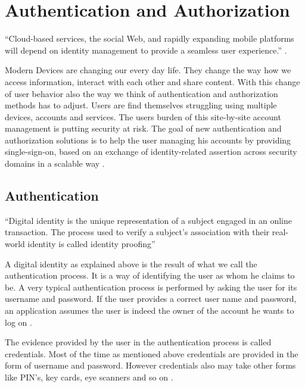 \chapter{Authentication and Authorization}\label{chap:authenticationandauthorization}

\chapterstart

“Cloud-based services, the social Web, and rapidly expanding mobile platforms will depend on identity management to provide a seamless user experience.”   \citet{Corre:2017:WHI}.

Modern Devices are changing our every day life. They change the way how we access information, interact with each other and share content. 
With this change of user behavior also the way we think of authentication and authorization methods has to adjust. Users are find themselves struggling using multiple devices, accounts and services. The users burden of this site-by-site account management is putting security at risk. The goal of new authentication and authorization solutions is to help the user managing his accounts by providing single-sign-on, based on an exchange of identity-related assertion across security domains in a scalable way \citet{Corre:2017:WHI}.  

\section{Authentication}

“Digital identity is the unique representation of a subject engaged in an online transaction. The process used to verify a subject’s association with their real-world identity is called identity proofing” \citet{NIST:2017:DIG}

A digital identity as explained above is the result of what we call the authentication process. It is a way of identifying the user as whom he claims to be. A very typical authentication process is performed by asking the user for its username and password. If the user provides a correct user name and password, an application assumes the user is indeed the owner of the account he wants to log on \citet{Boyed:2012:GSOA}. 

The evidence provided by the user in the authentication process is called credentials. Most of the time as mentioned above credentials are provided in the form of username and password. However credentials also may take other forms like PIN’s, key cards, eye scanners and so on \citet{Todorov:2007:MUI}. 

